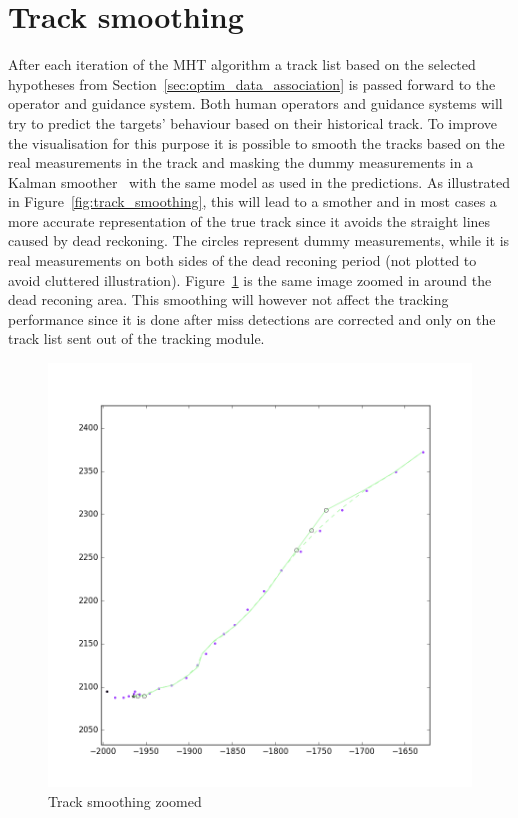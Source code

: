 \section{Track smoothing}
After each iteration of the MHT algorithm a track list based on the selected hypotheses from Section~\ref{sec:optim_data_association} is passed forward to the operator and guidance system. Both human operators and guidance systems will try to predict the targets' behaviour based on their historical track. To improve the visualisation for this purpose it is possible to smooth the tracks based on the real measurements in the track and masking the dummy measurements in a Kalman smoother~\cite{Brown2012} with the same model as used in the predictions. As illustrated in Figure~\ref{fig:track_smoothing}, this will lead to a smother and in most cases a more accurate representation of the true track since it avoids the straight lines caused by dead reckoning. The circles represent dummy measurements, while it is real measurements on both sides of the dead reconing period (not plotted to avoid cluttered illustration). Figure~\ref{fig:track_smoothing_zoomed} is the same image zoomed in around the dead reconing area. This smoothing will however not affect the \gls{tracking} performance since it is done after miss detections are corrected and only on the track list sent out of the tracking module.
\begin{figure}[H]
\centering
\includegraphics[trim={10cm 11cm 4cm 4cm},clip=true,height = .4\textheight]{Figures/track_smoothing_dummy_markers.png}
\caption{Track smoothing zoomed}\label{fig:track_smoothing_zoomed}
\end{figure}

